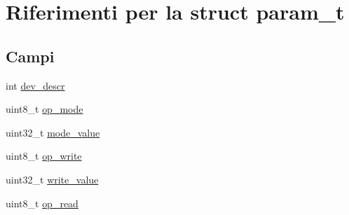\hypertarget{structparam__t}{\section{Riferimenti per la struct param\+\_\+t}
\label{structparam__t}
}
\subsection*{Campi}
\begin{DoxyCompactItemize}
\item 
int \hyperlink{structparam__t_a52701f5f8091598d5c5ac1bb80cd2070}{dev\+\_\+descr}
\item 
uint8\+\_\+t \hyperlink{structparam__t_aec948fb30e99b1eda7e3d9ff741d417a}{op\+\_\+mode}
\item 
uint32\+\_\+t \hyperlink{structparam__t_a007b34e09ccda08824bc74ab9d86c5a8}{mode\+\_\+value}
\item 
uint8\+\_\+t \hyperlink{structparam__t_a67752de733f167918a4e966354183a69}{op\+\_\+write}
\item 
uint32\+\_\+t \hyperlink{structparam__t_a09e0cff25312ab7f748a3063c038a2d9}{write\+\_\+value}
\item 
uint8\+\_\+t \hyperlink{structparam__t_ae66d5c3154a115636a63227b7489a6eb}{op\+\_\+read}
\end{DoxyCompactItemize}


